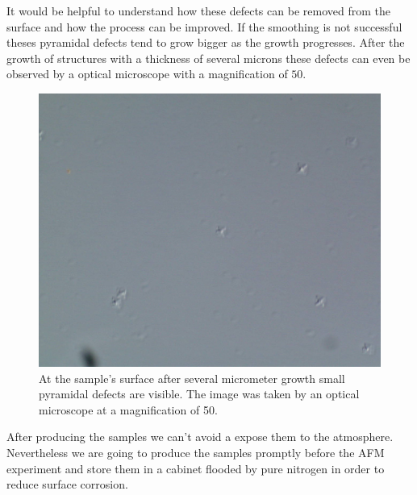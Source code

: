 It would be helpful to understand how these defects can be removed from the surface and how the process can be improved. If the smoothing is not successful theses pyramidal defects tend to grow bigger as the growth progresses. After the growth of structures with a thickness of several microns these defects can even be observed by a optical microscope with a magnification of $50$.\\
\begin{figure}
  \includegraphics[width=\linewidth]{Bilder/A2749_50_1}
  \caption{At the sample's surface after several micrometer growth small pyramidal defects are visible. The image was taken by an optical microscope at a magnification of 50.}
  \label{bandluecke}
\end{figure}
After producing the samples we can't avoid a expose them to the atmosphere. Nevertheless we are going to produce the samples promptly before the AFM experiment and store them in a cabinet flooded by pure nitrogen in order to reduce surface corrosion.



%
%	
%

